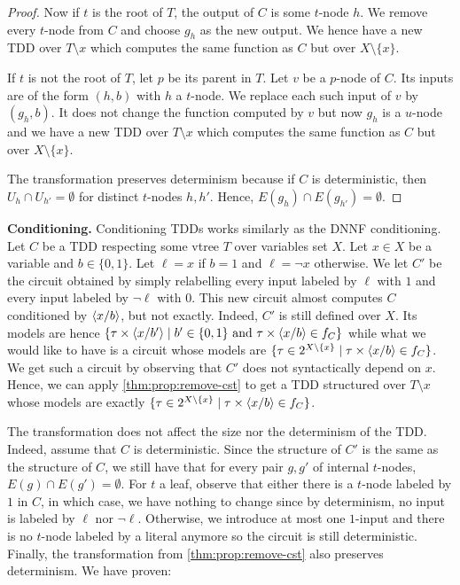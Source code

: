 \documentclass[a4paper,UKenglish,cleveref, autoref, thm-restate]{lipics-v2021}
\begin{document}
\begin{toappendix}
\begin{proof}
Now if $t$ is the root of $T$, the output of $C$ is some $t$-node $h$. We remove every $t$-node from $C$ and choose $g_h$ as the new output. We hence have a new TDD over $T \setminus x$ which computes the same function as $C$ but over $X \setminus \{x\}$.

If $t$ is not the root of $T$, let $p$ be its parent in $T$. Let $v$ be a $p$-node of $C$. Its inputs are of the form $(h, b)$ with $h$ a $t$-node. We replace each such input of $v$ by $(g_h,b)$. It does not change the function computed by $v$ but now $g_h$ is a $u$-node and we have a new TDD over $T \setminus x$ which computes the same function as $C$ but over $X \setminus \{x\}$.

The transformation preserves determinism because if $C$ is deterministic, then $U_h \cap U_{h'} = \emptyset$ for distinct $t$-nodes $h,h'$. Hence, $E(g_h) \cap E(g_{h'}) = \emptyset$.
\end{proof}

\textbf{Conditioning.} Conditioning TDDs works similarly as the DNNF conditioning. Let $C$ be a TDD respecting some vtree $T$ over variables set $X$. Let $x \in X$ be a variable and $b \in \{0,1\}$. Let $\ell = x$ if $b=1$ and $\ell = \neg x$ otherwise. We let $C'$ be the circuit obtained by simply relabelling every input labeled by $\ell$ with $1$ and every input labeled by $\neg \ell$ with $0$. This new circuit almost computes $C$ conditioned by $\tup[x/b]$, but not exactly. Indeed, $C'$ is still defined over $X$. Its models are hence  $\{\tau \times \tup[x/b'] \mid b' \in \{0,1\} \text{ and } \tau \times \tup[x/b] \in f_C \}$ while what we would like to have is a circuit whose models are $\{ \tau \in 2^{X \setminus \{x\}} \mid \tau \times \tup[x/b] \in f_C\}$. We get such a circuit by observing that $C'$ does not syntactically depend on $x$. Hence, we can apply \cref{thm:prop:remove-cst} to get a TDD structured over $T \setminus x$ whose models are exactly $\{ \tau \in 2^{X \setminus \{x\}} \mid \tau \times \tup[x/b] \in f_C\}$. 

The transformation does not affect the size nor the determinism of the TDD. Indeed, assume that $C$ is deterministic. Since the structure of $C'$ is the same as the structure of $C$, we still have that for every pair $g,g'$ of internal $t$-nodes, $E(g) \cap E(g') = \emptyset$. For $t$ a leaf, observe that either there is a $t$-node labeled by $1$ in $C$, in which case, we have nothing to change since by determinism, no input is labeled by $\ell$ nor $\neg \ell$. Otherwise, we introduce at most one $1$-input and there is no $t$-node labeled by a literal anymore so the circuit is still deterministic. Finally, the transformation from \cref{thm:prop:remove-cst} also preserves determinism. We have proven:


\end{toappendix}
\end{document}
